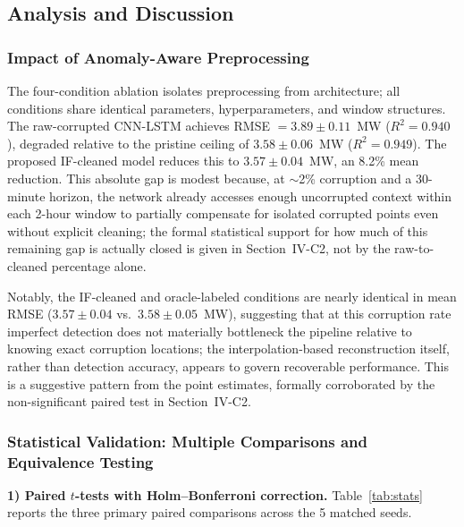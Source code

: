 \documentclass[conference]{IEEEtran}
\begin{document}
\FloatBarrier

\subsection{Analysis and Discussion}

\subsubsection{Impact of Anomaly-Aware Preprocessing}
The four-condition ablation isolates preprocessing from architecture; all conditions share identical parameters, hyperparameters, and window structures. The raw-corrupted CNN-LSTM achieves RMSE $=3.89 \pm 0.11$~MW ($R^2 = 0.940$), degraded relative to the pristine ceiling of $3.58 \pm 0.06$~MW ($R^2 = 0.949$). The proposed IF-cleaned model reduces this to $3.57 \pm 0.04$~MW, an 8.2\% mean reduction. This absolute gap is modest because, at $\sim$2\% corruption and a 30-minute horizon, the network already accesses enough uncorrupted context within each 2-hour window to partially compensate for isolated corrupted points even without explicit cleaning; the formal statistical support for how much of this remaining gap is actually closed is given in Section~IV-C2, not by the raw-to-cleaned percentage alone.

Notably, the IF-cleaned and oracle-labeled conditions are nearly identical in mean RMSE ($3.57 \pm 0.04$ vs.\ $3.58 \pm 0.05$~MW), suggesting that at this corruption rate imperfect detection does not materially bottleneck the pipeline relative to knowing exact corruption locations; the interpolation-based reconstruction itself, rather than detection accuracy, appears to govern recoverable performance. This is a suggestive pattern from the point estimates, formally corroborated by the non-significant paired test in Section~IV-C2.

\subsubsection{Statistical Validation: Multiple Comparisons and Equivalence Testing}
\label{sec:stats_results}

\textbf{1) Paired $t$-tests with Holm--Bonferroni correction.} Table~\ref{tab:stats} reports the three primary paired comparisons across the 5 matched seeds.
\end{document}
